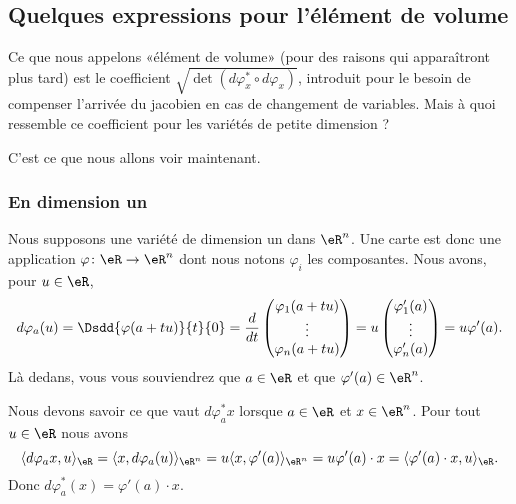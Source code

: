 \subsection{Quelques expressions pour l'élément de volume}

Ce que nous appelons «élément de volume» (pour des raisons qui apparaîtront plus tard) est le coefficient \( \sqrt{ \det(d\varphi_x^*\circ d\varphi_x) }\), introduit pour le besoin de compenser l'arrivée du jacobien en cas de changement de variables. Mais à quoi ressemble ce coefficient pour les variétés de petite dimension ?

C'est ce que nous allons voir maintenant.

\subsubsection{En dimension un}

Nous supposons une variété de dimension un dans \( \eR^n\). Une carte est donc une application \( \varphi\colon \eR\to \eR^n\) dont nous notons \( \varphi_i\) les composantes. Nous avons, pour \( u\in \eR\),
\begin{equation}
	d\varphi_a(u)=\Dsdd{ \varphi(a+tu) }{t}{0}=\frac{ d }{ dt }\begin{pmatrix}
		\varphi_1(a+tu) \\
		\vdots          \\
		\varphi_n(a+tu)
	\end{pmatrix}=u\begin{pmatrix}
		\varphi'_1(a) \\
		\vdots        \\
		\varphi_n'(a)
	\end{pmatrix}=u\varphi'(a).
\end{equation}
Là dedans, vous vous souviendrez que \( a\in \eR\) et que \( \varphi'(a)\in \eR^n\).

Nous devons savoir ce que vaut \( d\varphi_a^*x\) lorsque \( a\in \eR\) et \( x\in \eR^n\). Pour tout \( u\in \eR\) nous avons
\begin{equation}
	\langle d\varphi_ax, u\rangle_{\eR}=\langle x, d\varphi_a(u)\rangle_{\eR^n}=u\langle x, \varphi'(a)\rangle_{\eR^n}=u\varphi'(a)\cdot x=\langle \varphi'(a)\cdot x, u\rangle_{\eR}.
\end{equation}
Donc \( d\varphi_a^*(x)=\varphi'(a)\cdot x\).

